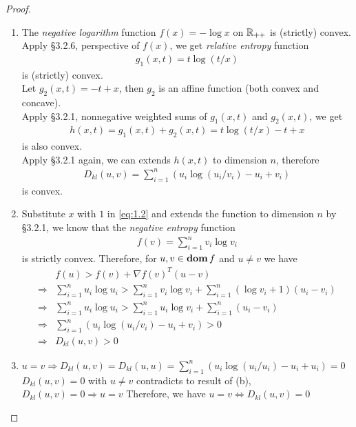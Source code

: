 \documentclass[12pt]{extarticle}
\theoremstyle{definition}
\begin{document}
\begin{proof}
  $ $
  \begin{enumerate}[label=(\alph*)]
    \item The \textit{negative logarithm} function $f(x)=-\log x$ on $\mathbb{R}_{++}$ is (strictly) convex.\\
          Apply \S 3.2.6, perspective of $f(x)$, we get \textit{relative entropy} function
          \begin{align}
            g_1(x,t)=t\log(t/x)\label{eq:1.2}
          \end{align}
          is (strictly) convex.\\
          Let $g_2(x,t)=-t+x$, then $g_2$ is an affine function (both convex and concave).\\
          Apply \S 3.2.1, nonnegative weighted sums of $g_1(x,t)$ and $g_2(x,t)$, we get
          \begin{align*}
            h(x,t)=g_1(x,t)+g_2(x,t)=t\log(t/x)-t+x
          \end{align*}
          is also convex.\\
          Apply \S 3.2.1 again, we can extends $h(x,t)$ to dimension $n$, therefore
          \begin{align*}
            D_{kl}(u,v)=\sum_{i=1}^n(u_i\log(u_i/v_i)-u_i+v_i)
          \end{align*}
          is convex.
    \item Substitute $x$ with $1$ in \eqref{eq:1.2} and extends the function to dimension $n$ by \S 3.2.1, we know that the \textit{negative entropy} function
          \begin{align*}
            f(v)=\sum_{i=1}^nv_i\log v_i
          \end{align*}
          is strictly convex. Therefore, for $u, v\in\mathop{\bf dom} f$ and $u\neq v$ we have
          \begin{align*}
            & f(u)>f(v)+\nabla f(v)^T(u-v)\\
            \Rightarrow & \sum_{i=1}^nu_i\log u_i>\sum_{i=1}^nv_i\log v_i+\sum_{i=1}^n(\log v_i+1)(u_i-v_i)\\
            \Rightarrow & \sum_{i=1}^nu_i\log u_i>\sum_{i=1}^nu_i\log v_i+\sum_{i=1}^n(u_i-v_i)\\
            \Rightarrow & \sum_{i=1}^n(u_i\log(u_i/v_i)-u_i+v_i)>0\\
            \Rightarrow & D_{kl}(u,v)>0
          \end{align*}
    \item $u=v\Rightarrow D_{kl}(u,v)=D_{kl}(u,u)=\sum_{i=1}^n(u_i\log(u_i/u_i)-u_i+u_i)=0$\\
          $D_{kl}(u,v)=0$ with $u\neq v$ contradicts to result of (b), \ie $D_{kl}(u,v)=0\Rightarrow u=v$
          Therefore, we have $u=v\Leftrightarrow D_{kl}(u,v)=0$\qedhere
  \end{enumerate}
\end{proof}
    
\end{document}
